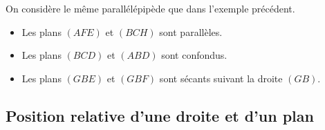 \begin{ex}
	On considère le même parallélépipède que dans l'exemple précédent.
	\begin{itemize}
		\item Les plans $(AFE)$ et $(BCH)$ sont parallèles.
		\item Les plans $(BCD)$ et $(ABD)$ sont confondus.
		\item Les plans $(GBE)$ et $(GBF)$ sont sécants suivant la droite $(GB)$.
	\end{itemize}
\end{ex}


\subsection{Position relative d'une droite et d'un plan}

